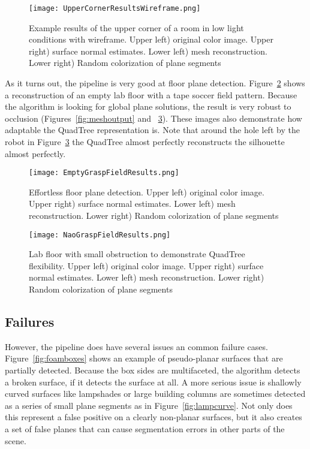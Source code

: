 \begin{figure}[!htpb]
    \centering
    \texttt{[image: UpperCornerResultsWireframe.png]}
    \caption{Example results of the upper corner of a room in low light conditions with wireframe.  Upper left) original color image. Upper right) surface normal estimates. Lower left) mesh reconstruction. Lower right) Random colorization of plane segments}
    \label{fig:uppercornerwireframelowlight}
\end{figure}
As it turns out, the pipeline is very good at floor plane detection. Figure~\ref{fig:floorplane} shows a reconstruction of an empty lab floor with a tape soccer field pattern. Because the algorithm is looking for global plane solutions, the result is very robust to occlusion (Figures~\ref{fig:meshoutput} and ~\ref{fig:naoquadtree}). These images also demonstrate how adaptable the QuadTree representation is. Note that around the hole left by the robot in Figure~\ref{fig:naoquadtree} the QuadTree almost perfectly reconstructs the silhouette almost perfectly.

\begin{figure}[!htpb]
    \centering
    \texttt{[image: EmptyGraspFieldResults.png]}
    \caption{Effortless floor plane detection. Upper left) original color image. Upper right) surface normal estimates. Lower left) mesh reconstruction. Lower right) Random colorization of plane segments}
    \label{fig:floorplane}
\end{figure}


\begin{figure}[!htpb]
    \centering
    \texttt{[image: NaoGraspFieldResults.png]}
    \caption{Lab floor with small obstruction to demonstrate QuadTree flexibility. Upper left) original color image. Upper right) surface normal estimates. Lower left) mesh reconstruction. Lower right) Random colorization of plane segments}
    \label{fig:naoquadtree}
\end{figure}


\subsection{Failures}
However, the pipeline does have several issues an common failure cases. Figure~\ref{fig:foamboxes} shows an example of pseudo-planar surfaces that are partially detected. Because the box sides are multifaceted, the algorithm detects a broken surface, if it detects the surface at all. A more serious issue is shallowly curved surfaces like lampshades or large building columns are sometimes detected as a series of small plane segments as in Figure~\ref{fig:lampcurve}. Not only does this represent a false positive on a clearly non-planar surfaces, but it also creates a set of false planes that can cause segmentation errors in other parts of the scene.

